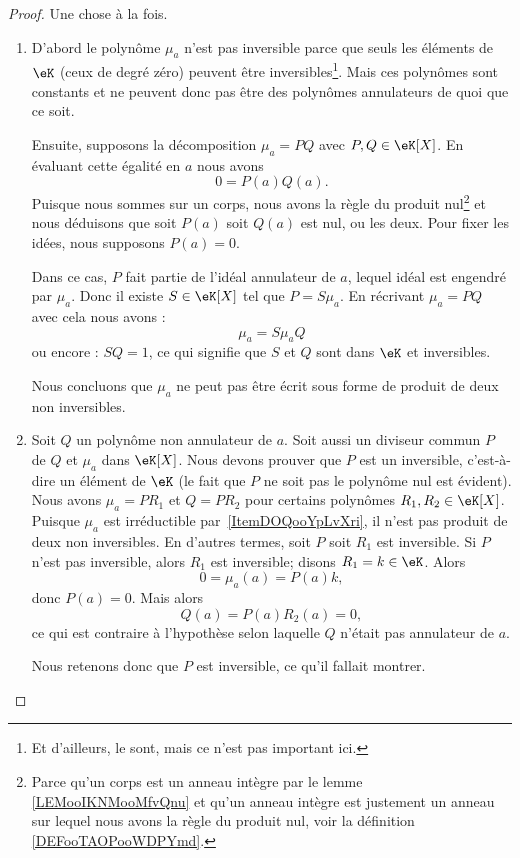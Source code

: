\begin{proof}
	Une chose à la fois.
	\begin{enumerate}
		\item
		      D'abord le polynôme \( \mu_a\) n'est pas inversible parce que seuls les éléments de \( \eK\) (ceux de degré zéro) peuvent être inversibles\footnote{Et d'ailleurs, le sont, mais ce n'est pas important ici.}. Mais ces polynômes sont constants et ne peuvent donc pas être des polynômes annulateurs de quoi que ce soit.

		      Ensuite, supposons la décomposition \( \mu_a=PQ\) avec \( P,Q\in \eK[X]\). En évaluant cette égalité en \( a\) nous avons
		      \begin{equation}
			      0=P(a)Q(a).
		      \end{equation}
		      Puisque nous sommes sur un corps, nous avons la règle du produit nul\footnote{Parce qu'un corps est un anneau intègre par le lemme \ref{LEMooIKNMooMfvQnu} et qu'un anneau intègre est justement un anneau sur lequel nous avons la règle du produit nul, voir la définition \ref{DEFooTAOPooWDPYmd}.} et nous déduisons que soit \( P(a)\) soit \( Q(a)\) est nul, ou les deux. Pour fixer les idées, nous supposons \( P(a)=0\).

		      Dans ce cas, \( P\) fait partie de l'idéal annulateur de \( a\), lequel idéal est engendré par \( \mu_a\). Donc il existe \( S\in \eK[X]\) tel que \( P=S\mu_a\). En récrivant \( \mu_a=PQ\) avec cela nous avons :
		      \begin{equation}
			      \mu_a=S\mu_aQ
		      \end{equation}
		      ou encore : \( SQ=1\), ce qui signifie que \( S\) et \( Q\) sont dans \( \eK\) et inversibles.

		      Nous concluons que \( \mu_a\) ne peut pas être écrit sous forme de produit de deux non inversibles.
		\item
		      Soit \( Q\) un polynôme non annulateur de \( a\). Soit aussi un diviseur commun \( P\) de \( Q\) et \( \mu_a\) dans \( \eK[X]\). Nous devons prouver que \( P\) est un inversible, c'est-à-dire un élément de \( \eK\) (le fait que \( P\) ne soit pas le polynôme nul est évident).
		      Nous avons \( \mu_a=PR_1\) et \( Q=PR_2\) pour certains polynômes \( R_1,R_2\in \eK[X]\). Puisque \( \mu_a\) est irréductible par~\ref{ItemDOQooYpLvXri}, il n'est pas produit de deux non inversibles. En d'autres termes, soit \( P\) soit \( R_1\) est inversible. Si \( P \) n'est pas inversible, alors \( R_1\) est inversible; disons \( R_1=k\in \eK\). Alors
		      \begin{equation}
			      0=\mu_a(a)=P(a)k,
		      \end{equation}
		      donc \( P(a)=0\). Mais alors
		      \begin{equation}
			      Q(a)=P(a)R_2(a)=0,
		      \end{equation}
		      ce qui est contraire à l'hypothèse selon laquelle \( Q\) n'était pas annulateur de \( a\).

		      Nous retenons donc que \( P\) est inversible, ce qu'il fallait montrer.
	\end{enumerate}
\end{proof}

